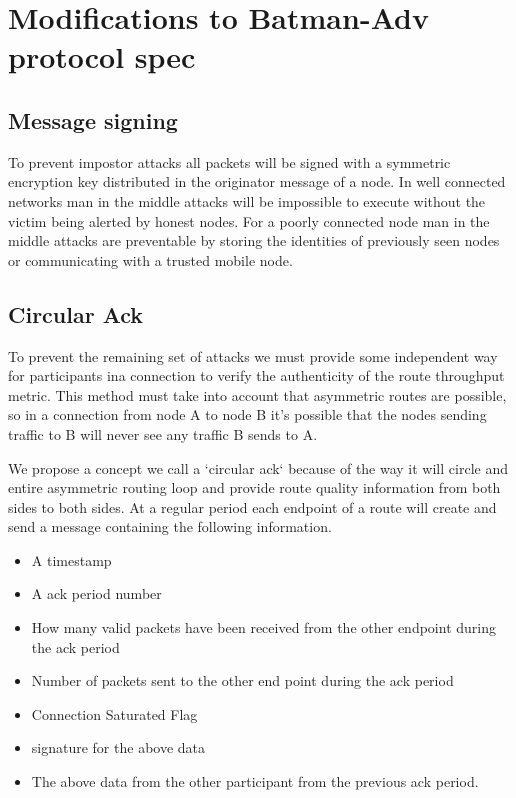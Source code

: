\documentclass[11pt]{article}
\begin{document}
\section{Modifications to Batman-Adv protocol spec}

	\subsection{Message signing} \label{crypto}
	
				To prevent impostor attacks all packets will be signed with a symmetric encryption key distributed in the originator message of a node. In well connected networks man in the middle attacks will be impossible to execute without the victim being alerted by honest nodes. For a poorly connected node man in the middle attacks are preventable by storing the identities of previously seen nodes or communicating with a trusted mobile node. 

    \subsection{Circular Ack} \label{ack}


               To prevent the remaining set of attacks we must provide some independent way for participants ina connection to verify the authenticity of the route throughput metric. This method must take into account that asymmetric routes are possible, so in a connection from node A to node B it's possible that the nodes sending traffic to B will never see any traffic B sends to A. 
               
               We propose a concept we call a `circular ack` because of the way it will circle and entire asymmetric routing loop and provide route quality information from both sides to both sides. At a regular period each endpoint of a route will create and send a message containing the following information. 

              \begin{itemize}
                \item A timestamp
                \item A ack period number
                \item How many valid packets have been received from the other endpoint during the ack period
                \item Number of packets sent to the other end point during the ack period
                \item Connection Saturated Flag
                \item signature for the above data
                \item The above data from the other participant from the previous ack period. 
              \end{itemize}
\end{document}
